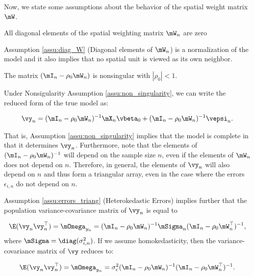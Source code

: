 \documentclass[english,12pt]{book}\usepackage[]{graphicx}\usepackage[]{xcolor}
\begin{document}
Now, we state some assumptions about the behavior of the spatial weight matrix $\mW$.

\begin{assumption}\label{assu:diag_W}
All diagonal elements of the spatial weighting matrix $\mW_n$ are zero
\end{assumption}

Assumption \ref{assu:diag_W} (Diagonal elements of $\mW_n$) is a normalization of the model and it also implies that no spatial unit is viewed as its own neighbor. 

\begin{assumption}\label{assu:non_singularity}
The matrix $(\mI_n - \rho_0\mW_n)$ is nonsingular with $\left|\rho_0 \right|<1$.
\end{assumption}

Under Nonsigularity Assumption \ref{assu:non_singularity}, we can write the reduced form of the true model as:

\begin{equation*}
  \vy_n = (\mI_n - \rho_0\mW_n)^{-1}\mX_n\vbeta_0 + (\mI_n - \rho_0\mW_n)^{-1}\vepsi_n.
\end{equation*}

That is, Assumption \ref{assu:non_singularity} implies that the model is complete in that it determines $\vy_n$. Furthermore, \cite{kelejian1998generalized} note that the elements of $(\mI_n - \rho_0\mW_n)^{-1}$ will depend on the sample size $n$, even if the elements of $\mW_n$ does not depend on $n$. Therefore, in general, the elements of $\vy_n$ will also depend on $n$ and thus form a triangular array, even in the case where the errors $\epsilon_{i,n}$ do not depend on $n$. 

Assumption \ref{assu:errors_triang} (Heterokedastic Errors) implies further that the population variance-covariance matrix of $\vy_n$ is equal to

\begin{equation}\label{eq:variance_of_y_slm}
  \E(\vy_n\vy^\top_n) = \mOmega_{y_n}= (\mI_n - \rho_0\mW_n)^{-1}\mSigma_n(\mI_n - \rho_0\mW^\top_n)^{-1},
\end{equation}
%
where $\mSigma = \diag(\sigma^2_{i, n})$. If we assume homokedasticity, then the variance-covariance matrix of $\vy$ reduces to:

\begin{equation*}
  \E(\vy_n\vy^\top_n) = \mOmega_{y_n} = \sigma^2_{\epsilon}(\mI_n - \rho_0\mW_n)^{-1}(\mI_n - \rho_0\mW^\top_n)^{-1}.
\end{equation*}
\end{document}
